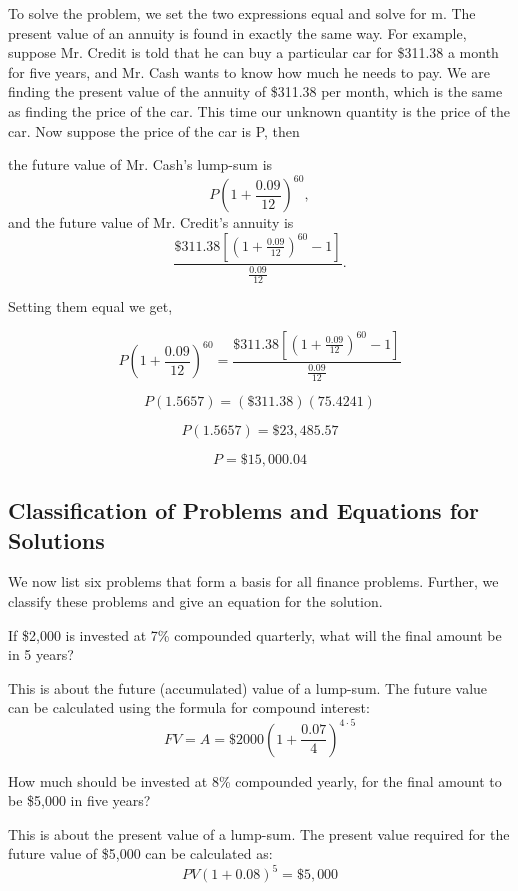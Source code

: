 To solve the problem, we set the two expressions equal and solve for m.
The present value of an annuity is found in exactly the same way.  For example, suppose Mr. Credit is told that he can buy a particular car for \$311.38 a month for five years, and Mr. Cash wants to know how much he needs to pay.  We are finding the present value of the annuity of \$311.38 per month, which is the same as finding the price of the car.  This time our unknown quantity is the price of the car.  Now suppose the price of the car is P, then

the future value of Mr. Cash's lump-sum is \[ P\left(1 + \frac{0.09}{12}\right)^{60},\] and the future value of Mr. Credit's annuity is \[\frac{\$311.38\left[\left(1 + \frac{0.09}{12}\right)^{60} - 1\right]}{\frac{0.09}{12}} .\]

Setting them equal we get,

\[
    P\left(1 + \frac{0.09}{12}\right)^{60} = \frac{\$311.38\left[\left(1 + \frac{0.09}{12}\right)^{60} - 1\right]}{\frac{0.09}{12}}
\]

\[
    P(1.5657) = (\$311.38)(75.4241)
\]

\[
    P(1.5657) = \$23,485.57
\]

\[
    P = \$15,000.04
\]

\subsection{Classification of Problems and Equations for Solutions}

We now list six problems that form a basis for all finance problems. Further, we classify these problems and give an equation for the solution.


\begin{example}
    If \$2,000 is invested at 7\% compounded quarterly, what will the final amount be in 5 years?
\end{example}
\begin{solution}
    This is about the future (accumulated) value of a lump-sum. The future value can be calculated using the formula for compound interest:
    \[ FV = A = \$2000\left(1 + \frac{0.07}{4}\right)^{4 \cdot 5} \]
\end{solution}

\begin{example}
    How much should be invested at 8\% compounded yearly, for the final amount to be \$5,000 in five years?
\end{example}
\begin{solution}
    This is about the present value of a lump-sum. The present value required for the future value of \$5,000 can be calculated as:
    \[ PV(1 + 0.08)^{5} = \$5,000 \]
\end{solution}

